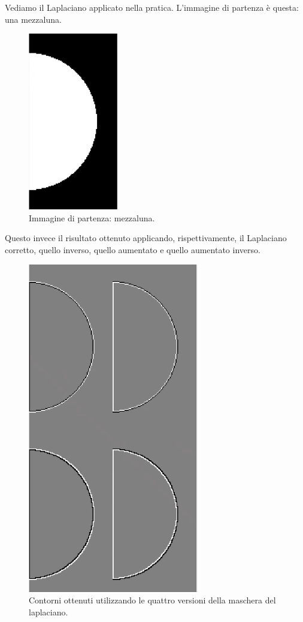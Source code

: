 \documentclass[a4paper,11pt]{article}
\begin{document}
Vediamo il Laplaciano applicato nella pratica. L'immagine di partenza è questa: una mezzaluna.

\renewcommand{\thefigure}{5.28}
\begin{figure}[!h]
  \centering
    \includegraphics[scale=0.4]{images/5/disc.png}
    \caption{Immagine di partenza: mezzaluna.}
\end{figure}

Questo invece il risultato ottenuto applicando, rispettivamente, il Laplaciano corretto, quello inverso, quello aumentato e quello aumentato inverso.

\renewcommand{\thefigure}{5.29}
\begin{figure}[!h]
  \centering
    \includegraphics[scale=0.4]{images/5/laplacian_contours.png}
    \caption{Contorni ottenuti utilizzando le quattro versioni della maschera del laplaciano.}
\end{figure}
\end{document}
